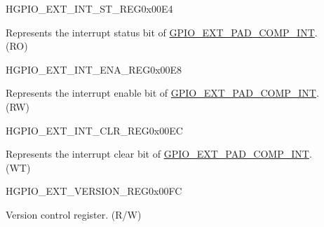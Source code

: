 \begin{register}{H}{GPIO\_EXT\_INT\_ST\_REG}{0x00E4}\label{regdesc:GPIOSDINTSTREG}
%
%
\regnewline%
\begin{regdesc}\begin{reglist}
\label{fielddesc:GPIOSDPADCOMPINTST}\item [GPIO\_EXT\_PAD\_COMP\_INT\_ST] Represents the interrupt status bit of \hyperref[sec:zcd_pads]{GPIO\_EXT\_PAD\_COMP\_INT}.\\
(RO)
\end{reglist}\end{regdesc}
\end{register}

\begin{register}{H}{GPIO\_EXT\_INT\_ENA\_REG}{0x00E8}\label{regdesc:GPIOSDINTENAREG}
%
%
\regnewline%
\begin{regdesc}\begin{reglist}
\label{fielddesc:GPIOSDPADCOMPINTENA}\item [GPIO\_EXT\_PAD\_COMP\_INT\_ENA] Represents the interrupt enable bit of \hyperref[sec:zcd_pads]{GPIO\_EXT\_PAD\_COMP\_INT}.\\
(RW)
\end{reglist}\end{regdesc}
\end{register}

\begin{register}{H}{GPIO\_EXT\_INT\_CLR\_REG}{0x00EC}\label{regdesc:GPIOSDINTCLRREG}
%
%
\regnewline%
\begin{regdesc}\begin{reglist}
\label{fielddesc:GPIOSDPADCOMPINTCLR}\item [GPIO\_EXT\_PAD\_COMP\_INT\_CLR] Represents the interrupt clear bit of \hyperref[sec:zcd_pads]{GPIO\_EXT\_PAD\_COMP\_INT}.\\
(WT)
\end{reglist}\end{regdesc}
\end{register}

\begin{register}{H}{GPIO\_EXT\_VERSION\_REG}{0x00FC}\label{regdesc:GPIOSDVERSIONREG}
%
%
\regnewline%
\begin{regdesc}\begin{reglist}
\label{fielddesc:GPIOSDGPIOSDDATE}\item [GPIO\_EXT\_DATE] Version control register. (R/W)
\end{reglist}\end{regdesc}
\end{register}

